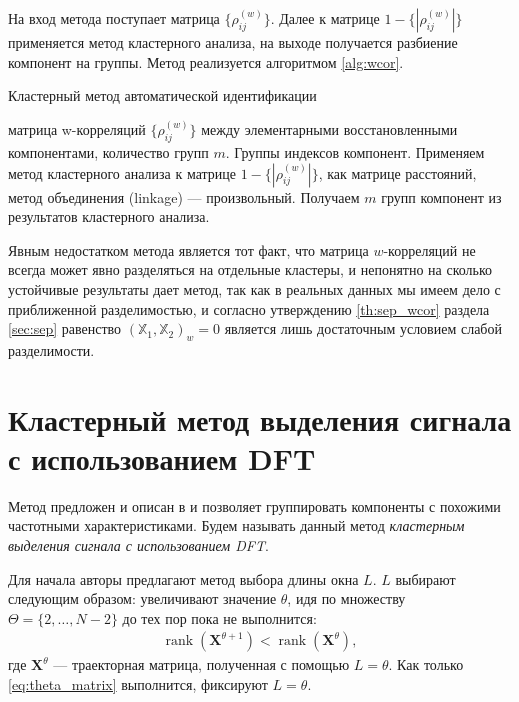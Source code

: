 \documentclass[specialist,
               substylefile = spbu.rtx,
               subf,href,colorlinks=true, 12pt]{disser}
\def\rank{\mathop{\mathrm{rank}}}
\begin{document}
На вход метода поступает матрица $\{\rho^{(w)}_{ij}\}$. Далее к матрице $1 -\{|\rho^{(w)}_{ij}|\}$ применяется метод кластерного анализа, на выходе получается разбиение компонент на группы. Метод реализуется алгоритмом \ref{alg:wcor}.

 \begin{algorithm}[!hhh]
\caption{Кластерный метод автоматической идентификации}
\label{alg:wcor}
\begin{algorithmic}[1]
\REQUIRE матрица w-корреляций $\{\rho^{(w)}_{ij}\}$ между элементарными восстановленными компонентами, количество групп $m$.
\ENSURE Группы индексов компонент.
\STATE  Применяем метод кластерного анализа к матрице $1 -\{|\rho^{(w)}_{ij}|\}$, как матрице расстояний, метод объединения (linkage) --- произвольный.
\STATE Получаем $m$ групп компонент из результатов кластерного анализа.
\end{algorithmic}
\end{algorithm}

Явным недостатком метода является тот факт, что матрица $w$-корреляций не всегда может явно разделяться на отдельные кластеры, и непонятно на сколько устойчивые результаты дает метод, так как в реальных данных мы имеем дело с приближенной разделимостью, и согласно утверждению \ref{th:sep_wcor} раздела \ref{sec:sep} равенство $\left(\mathbb{X}_1, \mathbb{X}_2 \right)_w = 0$ является лишь достаточным условием слабой разделимости. 

\section{Кластерный метод выделения сигнала с использованием DFT}
Метод предложен и описан в \cite{Alvarez2013} и позволяет группировать компоненты с похожими частотными характеристиками. Будем называть данный метод \textit{кластерным выделения сигнала с использованием DFT}.

Для начала авторы предлагают метод выбора длины окна $L$. 
$L$ выбирают следующим образом: увеличивают значение $\theta$, идя по множеству $\Theta = \{2,\ldots,N -2\}$ до тех пор пока не выполнится:
\begin{gather}
\label{eq:theta_matrix}
\rank(\mathbf{X}^{\theta+1}) < \rank(\mathbf{X}^{\theta}),
\end{gather}
где $\mathbf{X}^{\theta}$ --- траекторная матрица, полученная с помощью $L = \theta$. Как только \eqref{eq:theta_matrix} выполнится, фиксируют $L = \theta$. 
\end{document}
